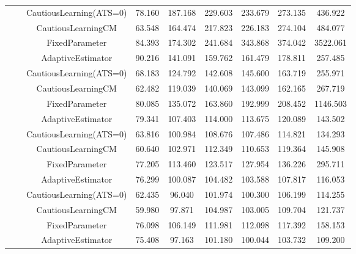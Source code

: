 \begin{table}[!h]
\begin{tabular}[t]{ccccccccc}
 &  & CautiousLearning(ATS=0) & 78.160 & 187.168 & 229.603 & 233.679 & 273.135 & 436.922\\

 &  & CautiousLearningCM & 63.548 & 164.474 & 217.823 & 226.183 & 274.104 & 484.077\\

 & \multirow[t]{-4}{*}{\centering\arraybackslash 0.35} & FixedParameter & 84.393 & 174.302 & 241.684 & 343.868 & 374.042 & 3522.061\\
\cmidrule{2-9}
 &  & AdaptiveEstimator & 90.216 & 141.091 & 159.762 & 161.479 & 178.811 & 257.485\\

 &  & CautiousLearning(ATS=0) & 68.183 & 124.792 & 142.608 & 145.600 & 163.719 & 255.971\\

 &  & CautiousLearningCM & 62.482 & 119.039 & 140.069 & 143.099 & 162.165 & 267.719\\

 & \multirow[t]{-4}{*}{\centering\arraybackslash 0.50} & FixedParameter & 80.085 & 135.072 & 163.860 & 192.999 & 208.452 & 1146.503\\
\cmidrule{2-9}
 &  & AdaptiveEstimator & 79.341 & 107.403 & 114.000 & 113.675 & 120.089 & 143.502\\

 &  & CautiousLearning(ATS=0) & 63.816 & 100.984 & 108.676 & 107.486 & 114.821 & 134.293\\

 &  & CautiousLearningCM & 60.640 & 102.971 & 112.349 & 110.653 & 119.364 & 145.908\\

 & \multirow[t]{-4}{*}{\centering\arraybackslash 0.75} & FixedParameter & 77.205 & 113.460 & 123.517 & 127.954 & 136.226 & 295.711\\
\cmidrule{2-9}
 &  & AdaptiveEstimator & 76.299 & 100.087 & 104.482 & 103.588 & 107.817 & 116.053\\

 &  & CautiousLearning(ATS=0) & 62.435 & 96.040 & 101.974 & 100.300 & 106.199 & 114.255\\

 &  & CautiousLearningCM & 59.980 & 97.871 & 104.987 & 103.005 & 109.704 & 121.737\\

 & \multirow[t]{-4}{*}{\centering\arraybackslash 1.00} & FixedParameter & 76.098 & 106.149 & 111.981 & 112.098 & 117.392 & 158.153\\
\cmidrule{2-9}
 &  & AdaptiveEstimator & 75.408 & 97.163 & 101.180 & 100.044 & 103.732 & 109.200\\


\end{tabular}
\end{table}
